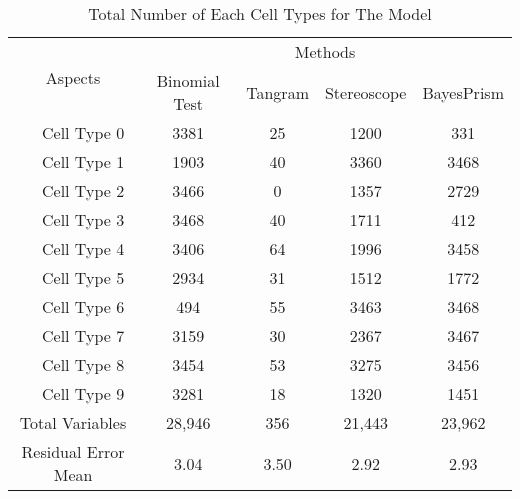 \documentclass{book}
\begin{document}
\begin{table}[!htb]
	\centering
	\begin{tabular}{|l|c|c|c|c|c|}
		\hline
		\multicolumn{2}{|c|}{\multirow{2}{*}{Aspects}} & \multicolumn{4}{c|}{Methods}                                             \\
		\cline{3-6}
		\multicolumn{2}{|l|}{}                         & Binomial Test                & Tangram & Stereoscope & BayesPrism        \\
		\hline
		\multirow{10}{*}{\rotatebox{90}{Total Number}} & Cell Type 0                  & 3381    & 25          & 1200       & 331  \\
		                                               & Cell Type 1                  & 1903    & 40          & 3360       & 3468 \\
		                                               & Cell Type 2                  & 3466    & 0           & 1357       & 2729 \\
		                                               & Cell Type 3                  & 3468    & 40          & 1711       & 412  \\
		                                               & Cell Type 4                  & 3406    & 64          & 1996       & 3458 \\
		                                               & Cell Type 5                  & 2934    & 31          & 1512       & 1772 \\
		                                               & Cell Type 6                  & 494     & 55          & 3463       & 3468 \\
		                                               & Cell Type 7                  & 3159    & 30          & 2367       & 3467 \\
		                                               & Cell Type 8                  & 3454    & 53          & 3275       & 3456 \\
		                                               & Cell Type 9                  & 3281    & 18          & 1320       & 1451 \\
		\hline
		\multicolumn{2}{|c|}{Total Variables}          & 28,946                       & 356     & 21,443      & 23,962            \\
		\multicolumn{2}{|c|}{Residual Error Mean}      & 3.04                         & 3.50    & 2.92        & 2.93              \\
		\hline
	\end{tabular}
	\caption{Total Number of Each Cell Types for The Model}
	\label{total_cell}
\end{table}
\newpage
\end{document}
